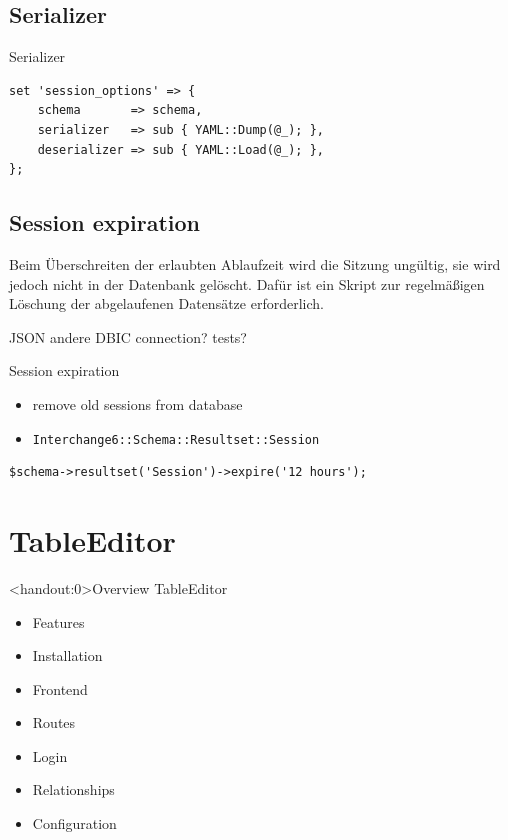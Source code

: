 \subsection{Serializer}
\begin{frame}[fragile]{Serializer}
\begin{lstlisting}
set 'session_options' => {
    schema       => schema,
    serializer   => sub { YAML::Dump(@_); },
    deserializer => sub { YAML::Load(@_); },
};
\end{lstlisting}
\end{frame}

\subsection{Session expiration}

Beim Überschreiten der erlaubten Ablaufzeit wird die Sitzung
ungültig, sie wird jedoch nicht in der Datenbank gelöscht.
Dafür ist ein Skript zur regelmäßigen Löschung der
abgelaufenen Datensätze erforderlich.

JSON
andere DBIC connection?
tests?

\begin{frame}[fragile]{Session expiration}
\begin{itemize}
\item remove old sessions from database
\item \verb|Interchange6::Schema::Resultset::Session|
\end{itemize}
\begin{lstlisting}
$schema->resultset('Session')->expire('12 hours');
\end{lstlisting}
\end{frame}

\section{TableEditor}

\begin{frame}<handout:0>{Overview TableEditor}
\begin{itemize}
\item Features
\item Installation
\item Frontend
\item Routes
\item Login
\item Relationships
\item Configuration
\end{itemize}
\end{frame}


